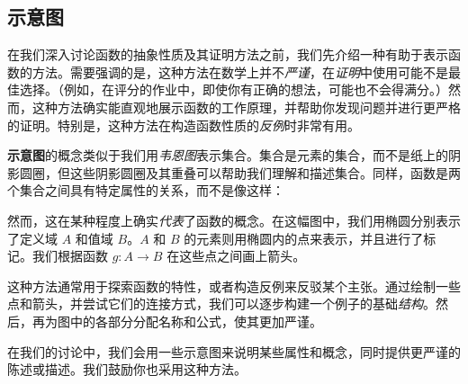 
\subsection{示意图}

在我们深入讨论函数的抽象性质及其证明方法之前，我们先介绍一种有助于表示函数的方法。需要强调的是，这种方法在数学上并不\emph{严谨}，在\emph{证明}中使用可能不是最佳选择。（例如，在评分的作业中，即使你有正确的想法，可能也不会得满分。）然而，这种方法确实能直观地展示函数的工作原理，并帮助你发现问题并进行更严格的证明。特别是，这种方法在构造函数性质的\emph{反例}时非常有用。

\textbf{示意图}的概念类似于我们用\emph{韦恩图}表示集合。集合是元素的集合，而不是纸上的阴影圆圈，但这些阴影圆圈及其重叠可以帮助我们理解和描述集合。同样，函数是两个集合之间具有特定属性的关系，而不是像这样：

\begin{center}
    {}
\end{center}

然而，这在某种程度上确实\emph{代表}了函数的概念。在这幅图中，我们用椭圆分别表示了定义域 $A$ 和值域 $B$。$A$ 和 $B$ 的元素则用椭圆内的点来表示，并且进行了标记。我们根据函数 $g: A \to B$ 在这些点之间画上箭头。

这种方法通常用于探索函数的特性，或者构造反例来反驳某个主张。通过绘制一些点和箭头，并尝试它们的连接方式，我们可以逐步构建一个例子的基础\emph{结构}。然后，再为图中的各部分分配名称和公式，使其更加严谨。

在我们的讨论中，我们会用一些示意图来说明某些属性和概念，同时提供更严谨的陈述或描述。我们鼓励你也采用这种方法。